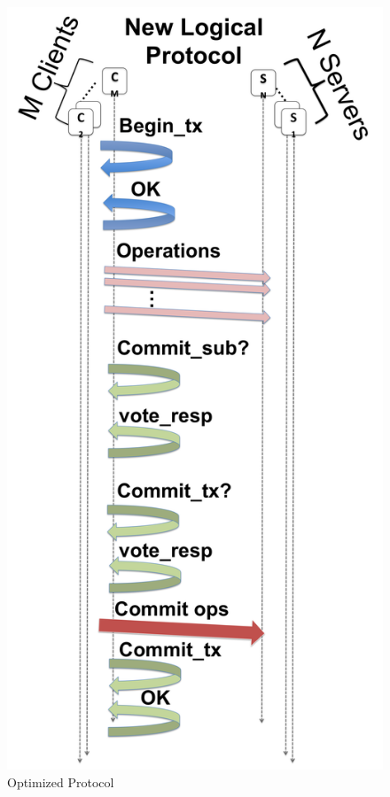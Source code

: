 \documentclass[conference]{sig-alt-gov2}
\begin{document}
\begin{figure}[ht]
\centering
\includegraphics[keepaspectratio=true, width=0.9\columnwidth]{images/optimized-protocol}
\vspace{-0.15in}
\caption{Optimized Protocol}
\label{fig:optimized-protocol}
\vspace{-0.25in}
\end{figure}
\end{document}
